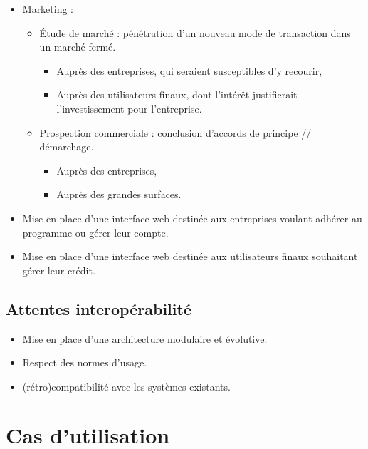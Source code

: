 \begin{itemize}
    \item Marketing :
        \begin{itemize}
            \item Étude de marché : pénétration d'un nouveau mode de
                transaction dans un marché fermé.
                \begin{itemize}
                    \item Auprès des entreprises, qui seraient susceptibles d'y
                        recourir,
                    \item Auprès des utilisateurs finaux, dont l'intérêt
                        justifierait l'investissement pour l'entreprise.
                \end{itemize}
            \item Prospection commerciale : conclusion d'accords de principe //
                démarchage.
                \begin{itemize}
                    \item Auprès des entreprises,
                    \item Auprès des grandes surfaces.
                \end{itemize}
        \end{itemize}
    \item Mise en place d'une interface web destinée aux entreprises voulant
        adhérer au programme ou gérer leur compte.
    \item Mise en place d'une interface web destinée aux utilisateurs finaux
        souhaitant gérer leur crédit.
\end{itemize}

\subsection{Attentes interopérabilité}

\begin{itemize}
    \item Mise en place d'une architecture modulaire et évolutive.
    \item Respect des normes d'usage.
    \item (rétro)compatibilité avec les systèmes existants.
\end{itemize}

\section{Cas d'utilisation}

